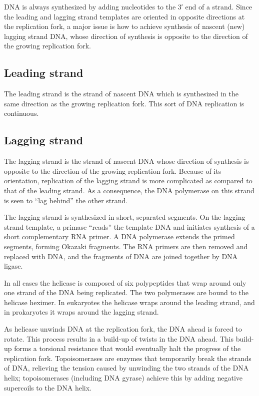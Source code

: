 DNA is always synthesized by adding nucleotides to the 3′ end of a strand. Since the leading and lagging strand templates are oriented in opposite directions at the replication fork, a major issue is how to achieve synthesis of nascent (new) lagging strand DNA, whose direction of synthesis is opposite to the direction of the growing replication fork.

\hypertarget{leading-strand}{%
\subsection{Leading strand}\label{leading-strand}}

The leading strand is the strand of nascent DNA which is synthesized in the same direction as the growing replication fork. This sort of DNA replication is continuous.

\hypertarget{lagging-strand}{%
\subsection{Lagging strand}\label{lagging-strand}}

The lagging strand is the strand of nascent DNA whose direction of synthesis is opposite to the direction of the growing replication fork. Because of its orientation, replication of the lagging strand is more complicated as compared to that of the leading strand. As a consequence, the DNA polymerase on this strand is seen to ``lag behind'' the other strand.

The lagging strand is synthesized in short, separated segments. On the lagging strand template, a primase ``reads'' the template DNA and initiates synthesis of a short complementary RNA primer. A DNA polymerase extends the primed segments, forming Okazaki fragments. The RNA primers are then removed and replaced with DNA, and the fragments of DNA are joined together by DNA ligase.

In all cases the helicase is composed of six polypeptides that wrap around only one strand of the DNA being replicated. The two polymerases are bound to the helicase heximer. In eukaryotes the helicase wraps around the leading strand, and in prokaryotes it wraps around the lagging strand.

As helicase unwinds DNA at the replication fork, the DNA ahead is forced to rotate. This process results in a build-up of twists in the DNA ahead. This build-up forms a torsional resistance that would eventually halt the progress of the replication fork. Topoisomerases are enzymes that temporarily break the strands of DNA, relieving the tension caused by unwinding the two strands of the DNA helix; topoisomerases (including DNA gyrase) achieve this by adding negative supercoils to the DNA helix.

